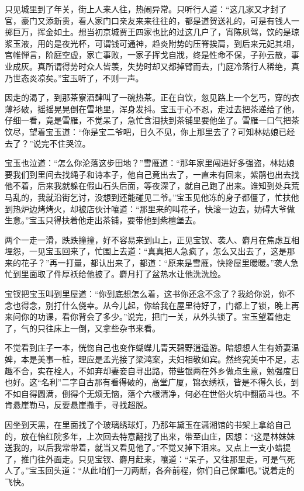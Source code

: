 \documentclass[12pt,oneside]{book}
\begin{document}
只见城里到了年关，街上人来人往，热闹异常。只听行人道：“这几家又才封了官，豪门又添新贵，看人家门口亲友来来往往的，都是道贺送礼的，可是有钱人一掷巨万，挥金如土。想当初京城贾王四家也比的过这几户了，宵陈夙驾，饮的是琼浆玉液，用的是夜光杯，可谓钱可通神，趋炎附势的压脊挨肩，到后来元妃其俎，宫帷惮言，阶庭空虚，家亡事败，一家子挥戈自戕，终是性命不保，子孙云散，事业成灰。真所谓得势时众人皆羡，失势时却又都掉臂而去，门庭冷落行人稀绝，真乃世态炎凉矣。”宝玉听了，不则一声。

因走的渴了，到那茶寮酒肆叫了一碗热茶。正在自饮，忽见路上一个乞丐，穿的衣薄衫破，摇摇晃晃倒在雪地里，浑身发抖。宝玉于心不忍，走过去把茶递给了他，仔细一看，竟是雪雁，不觉呆了，急忙含泪扶到茶铺里要他坐了。雪雁一口气把茶饮尽，望着宝玉道：“你是宝二爷吧，日久不见，你上那里去了？可知林姑娘已经去了？”说完不住哭泣。

宝玉也泣道：“怎么你沦落这步田地？”雪雁道：“那年家里闯进好多强盗，林姑娘要我们到里间去找绳子和诗本子，他自己竟出去了，一直未有回来，紫鹃也出去找他不着，后来我就躲在假山石头后面，等夜深了，就自己跑了出来。谁知到处兵荒马乱的，我就沿街乞讨，没想到还能碰见二爷。”宝玉见他冻的身子都僵了，忙扶他到热炉边烤烤火，却被店伙计嚷道：“那里来的叫花子，快滚一边去，妨碍大爷做生意。”宝玉只得扶着他走出茶铺，要带他到紫檀堡去。

两个一走一滑，跌跌撞撞，好不容易来到山上，正见宝钗、袭人、麝月在焦虑互相埋怨，一见宝玉回来了，忙围上去道：“真真把人急疯了，怎么又出去了，这是那来的花子？”再一打量，都认出来了，都道：“原来是雪雁，快搀屋里暖暖。”袭人急忙到里面取了件厚袄给他披了。麝月打了盆热水让他洗洗脸。

宝钗把宝玉叫到里屋道：“你到底想怎么着，这书你还念不念了？我给你说，你不念也得念，别打什么侥幸。从今儿起，你给我在屋里待好了，门都上了锁，晚上再来问你的功课，看你背会了多少。”说完，把门一关，从外头锁了。宝玉望着他走了，气的只往床上一倒，又拿些杂书来看。

不觉看到庄子一本，恍惚自己也变作蝴蝶儿青天碧野逍遥游。暗想想人生有娇妻温婢，本是美事一桩，理应是孟光接了梁鸿案，夫妇相敬如宾。然终究美中不足，志趣不合，实在栓人，不如弃却妻妾自寻出路，带些银两在外乡做点生意，勉强度日也好。这“名利”二字自古那有看得破的，高堂广厦，锦衣绣袄，皆是不得久长，到不如自得圆满，倒得个无烦无恼，落个六根清净，何必在世俗火坑中翻筋斗也。不肯悬崖勒马，反要悬崖撒手，寻找超脱。

因坐到天黑，在里面找了个玻璃绣球灯，乃那年黛玉在潇湘馆的书架上拿给自己的，放在怡红院多年，上次回去特意翻找了出来，带至山庄，因想：“这是林妹妹送我的，以后我常带着，就当又看见他了。”不觉又掉下泪来。又点上一支小蜡提了，推门往外面走。只见宝钗、麝月赶来，嚷道：“呆子，又往那里走，可是气死人了。”宝玉回头道：“从此咱们一刀两断，各奔前程，你们自己保重吧。”说着走的飞快。
\end{document}
